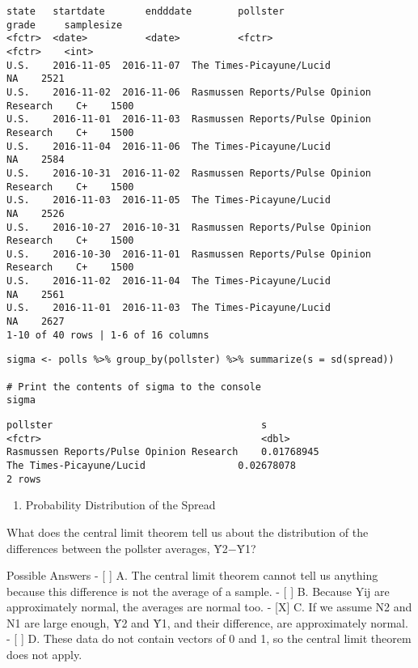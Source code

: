 \documentclass[
]{article}
\providecommand{\tightlist}{%
  \setlength{\itemsep}{0pt}\setlength{\parskip}{0pt}}
\begin{document}
\begin{verbatim}
state   startdate       endddate        pollster                                        grade     samplesize   
<fctr>  <date>          <date>          <fctr>                                          <fctr>    <int>
U.S.    2016-11-05  2016-11-07  The Times-Picayune/Lucid                    NA    2521  
U.S.    2016-11-02  2016-11-06  Rasmussen Reports/Pulse Opinion Research    C+    1500  
U.S.    2016-11-01  2016-11-03  Rasmussen Reports/Pulse Opinion Research    C+    1500  
U.S.    2016-11-04  2016-11-06  The Times-Picayune/Lucid                    NA    2584  
U.S.    2016-10-31  2016-11-02  Rasmussen Reports/Pulse Opinion Research    C+    1500  
U.S.    2016-11-03  2016-11-05  The Times-Picayune/Lucid                    NA    2526  
U.S.    2016-10-27  2016-10-31  Rasmussen Reports/Pulse Opinion Research    C+    1500  
U.S.    2016-10-30  2016-11-01  Rasmussen Reports/Pulse Opinion Research    C+    1500  
U.S.    2016-11-02  2016-11-04  The Times-Picayune/Lucid                    NA    2561  
U.S.    2016-11-01  2016-11-03  The Times-Picayune/Lucid                    NA    2627  
1-10 of 40 rows | 1-6 of 16 columns
\end{verbatim}

\begin{verbatim}
sigma <- polls %>% group_by(pollster) %>% summarize(s = sd(spread))

# Print the contents of sigma to the console
sigma
\end{verbatim}

\begin{verbatim}
pollster                                    s
<fctr>                                      <dbl>
Rasmussen Reports/Pulse Opinion Research    0.01768945
The Times-Picayune/Lucid                0.02678078
2 rows
\end{verbatim}

\begin{enumerate}
\def\labelenumi{\arabic{enumi}.}
\setcounter{enumi}{13}
\tightlist
\item
  Probability Distribution of the Spread
\end{enumerate}

What does the central limit theorem tell us about the distribution of
the differences between the pollster averages, Ȳ2−Ȳ1?

Possible Answers - {[} {]} A. The central limit theorem cannot tell us
anything because this difference is not the average of a sample. - {[}
{]} B. Because Yij are approximately normal, the averages are normal
too. - {[}X{]} C. If we assume N2 and N1 are large enough, Ȳ2 and Ȳ1,
and their difference, are approximately normal. - {[} {]} D. These data
do not contain vectors of 0 and 1, so the central limit theorem does not
apply.
\end{document}
